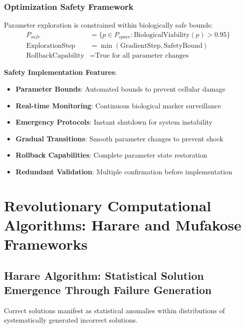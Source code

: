 ﻿\documentclass[11pt,a4paper]{article}
\begin{document}
\subsubsection{Optimization Safety Framework}

\begin{definition}
Parameter exploration is constrained within biologically safe bounds:
\begin{align}
P_{safe} &= \{p \in P_{space} : \text{BiologicalViability}(p) > 0.95\} \\
\text{ExplorationStep} &= \min(\text{GradientStep}, \text{SafetyBound}) \\
\text{RollbackCapability} &= \text{True for all parameter changes}
\end{align}
\end{definition}

\textbf{Safety Implementation Features}:
\begin{itemize}
\item \textbf{Parameter Bounds}: Automated bounds to prevent cellular damage
\item \textbf{Real-time Monitoring}: Continuous biological marker surveillance
\item \textbf{Emergency Protocols}: Instant shutdown for system instability
\item \textbf{Gradual Transitions}: Smooth parameter changes to prevent shock
\item \textbf{Rollback Capabilities}: Complete parameter state restoration
\item \textbf{Redundant Validation}: Multiple confirmation before implementation
\end{itemize}

\section{Revolutionary Computational Algorithms: Harare and Mufakose Frameworks}

\subsection{Harare Algorithm: Statistical Solution Emergence Through Failure Generation}

\begin{theorem}
Correct solutions manifest as statistical anomalies within distributions of systematically generated incorrect solutions.
\end{theorem}
\end{document}
